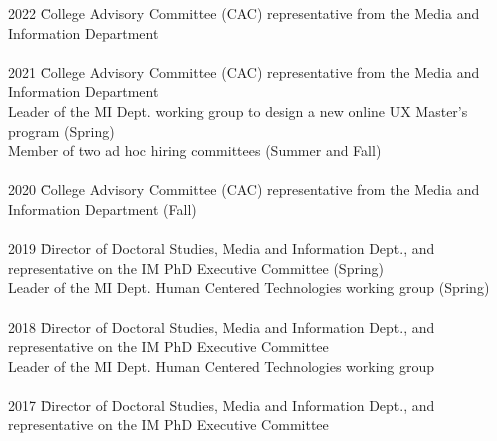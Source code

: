 \documentclass[9pt]{extarticle}
\begin{document}
\begin{tabbing}
2022 \hspace{0.3in}\= College Advisory Committee (CAC) representative from the Media and \\ 
\> \hspace{0.5cm} Information Department \\\\

2021 \hspace{0.3in}\= College Advisory Committee (CAC) representative from the Media and \\ 
\> \hspace{0.5cm} Information Department \\
\> Leader of the MI Dept. working group to design a new online UX Master's \\
\> \hspace{0.5cm} program (Spring) \\
\> Member of two ad hoc hiring committees (Summer and Fall) \\\\

2020 \hspace{0.3in}\= College Advisory Committee (CAC) representative from the Media and \\ 
\> \hspace{0.5cm} Information Department (Fall) \\\\

2019 \hspace{0.3in}\= Director of Doctoral Studies, Media and Information Dept., and \\
\> \hspace{0.5cm} representative on the IM PhD Executive Committee (Spring) \\
\> Leader of the MI Dept. Human Centered Technologies working group (Spring) \\\\

2018 \hspace{0.3in}\= Director of Doctoral Studies, Media and Information Dept., and \\
\> \hspace{0.5cm} representative on the IM PhD Executive Committee \\
\> Leader of the MI Dept. Human Centered Technologies working group \\\\

2017 \hspace{0.3in}\= Director of Doctoral Studies, Media and Information Dept., and \\
\> \hspace{0.5cm} representative on the IM PhD Executive Committee \\\\


\end{tabbing}
\end{document}
